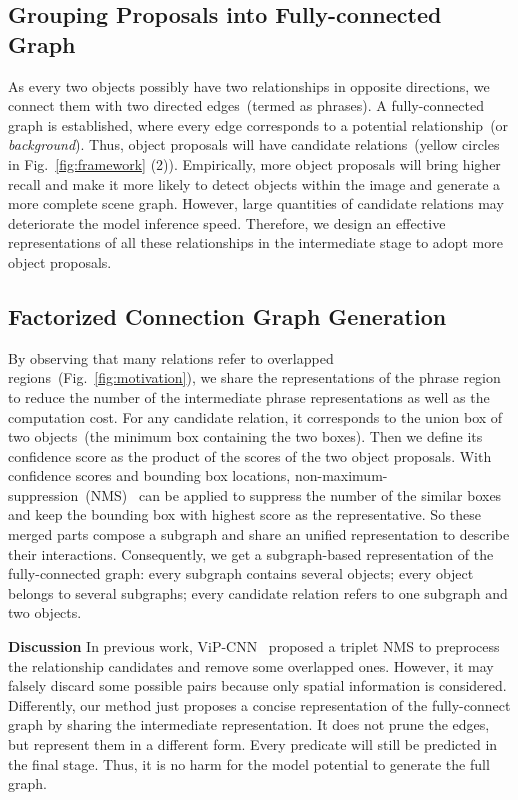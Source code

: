 \documentclass[runningheads]{llncs}
\begin{document}
\subsection{Grouping Proposals into Fully-connected Graph}
As every two objects possibly have two relationships in opposite directions, we connect them with two directed edges~(termed as phrases). A fully-connected graph is established, where every edge corresponds to a potential relationship~(or \emph{background}). Thus,  object proposals will have  candidate relations~(yellow circles in Fig.~\ref{fig:framework} (2)). Empirically, more object proposals will bring higher recall and make it more likely to detect objects within the image and generate a more complete scene graph. However, large quantities of candidate relations may deteriorate the model inference speed. Therefore, we design an effective representations of all these relationships in the intermediate stage to adopt more object proposals.
  

\subsection{Factorized Connection Graph Generation}\label{sec:subgraph}
By observing that many relations refer to overlapped regions~(Fig.~\ref{fig:motivation}), we share the representations of the phrase region to reduce the number of the intermediate phrase representations as well as the computation cost. 
For any candidate relation, it corresponds to the union box of two objects~(the minimum box containing the two boxes). Then we define its confidence score as the product of the scores of the two object proposals. With confidence scores and bounding box locations, non-maximum-suppression~(NMS)~\cite{fast_rcnn} can be applied to suppress the number of the similar boxes and keep the bounding box with highest score as the representative. So these merged parts compose a subgraph and share an unified representation to describe their interactions. 
Consequently, we get a subgraph-based representation of the fully-connected graph: every subgraph contains several objects; every object belongs to several subgraphs; every candidate relation refers to one subgraph and two objects. 

\noindent\textbf{Discussion} In previous work, ViP-CNN~\cite{li2017vip} proposed a triplet NMS to preprocess the relationship candidates and remove some overlapped ones. However, it may falsely discard some possible pairs because only spatial information is considered. Differently, our method just proposes a concise representation of the fully-connect graph by sharing the intermediate representation. It does not prune the edges, but represent them in a different form. Every predicate will still be predicted in the final stage. Thus, it is no harm for the model potential to generate the full graph. 
\end{document}
